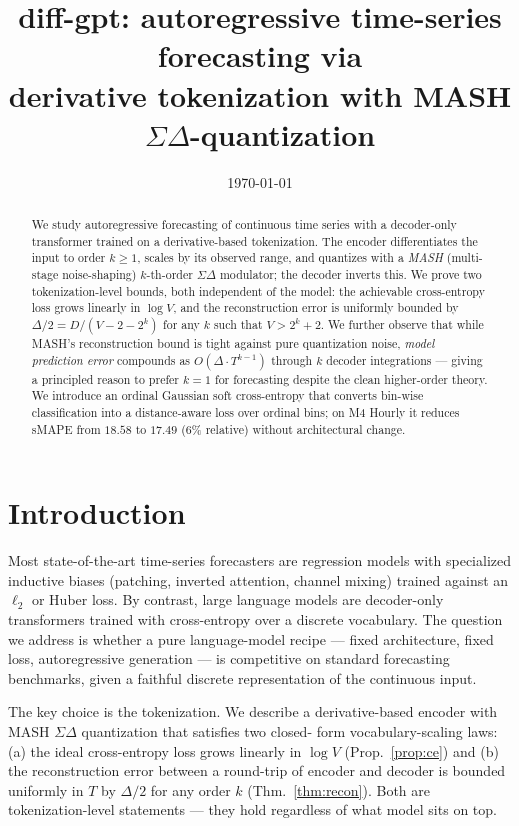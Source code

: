 \documentclass[11pt]{article}
\title{diff-gpt: autoregressive time-series forecasting via \\
       derivative tokenization with MASH $\Sigma\Delta$-quantization}
\author{}
\date{\today}
\theoremstyle{remark}
\begin{document}
\maketitle

\begin{abstract}
We study autoregressive forecasting of continuous time series with a
decoder-only transformer trained on a derivative-based tokenization.
The encoder differentiates the input to order $k \ge 1$, scales by its
observed range, and quantizes with a \emph{MASH} (multi-stage
noise-shaping) $k$-th-order $\Sigma\Delta$ modulator; the decoder
inverts this. We prove two tokenization-level bounds, both independent
of the model: the achievable cross-entropy loss grows linearly in
$\log V$, and the reconstruction error is uniformly bounded by $\Delta/2
= D/(V-2-2^k)$ for any $k$ such that $V > 2^k + 2$. We further observe
that while MASH's reconstruction bound is tight against pure
quantization noise, \emph{model prediction error} compounds as
$O(\Delta \cdot T^{k-1})$ through $k$ decoder integrations --- giving a
principled reason to prefer $k = 1$ for forecasting despite the clean
higher-order theory. We introduce an ordinal Gaussian soft cross-entropy
that converts bin-wise classification into a distance-aware loss over
ordinal bins; on M4 Hourly it reduces sMAPE from $18.58$ to $17.49$
(6\% relative) without architectural change.
\end{abstract}

\section{Introduction}

Most state-of-the-art time-series forecasters are regression models with
specialized inductive biases (patching, inverted attention, channel
mixing) trained against an $\ell_2$ or Huber loss. By contrast, large
language models are decoder-only transformers trained with cross-entropy
over a discrete vocabulary. The question we address is whether a pure
language-model recipe --- fixed architecture, fixed loss,
autoregressive generation --- is competitive on standard forecasting
benchmarks, given a faithful discrete representation of the continuous
input.

The key choice is the tokenization. We describe a derivative-based
encoder with MASH $\Sigma\Delta$ quantization that satisfies two closed-
form vocabulary-scaling laws: (a) the ideal cross-entropy loss grows
linearly in $\log V$ (Prop.~\ref{prop:ce}) and (b) the reconstruction
error between a round-trip of encoder and decoder is bounded uniformly
in $T$ by $\Delta/2$ for any order $k$ (Thm.~\ref{thm:recon}). Both are
tokenization-level statements --- they hold regardless of what model
sits on top.
\end{document}
